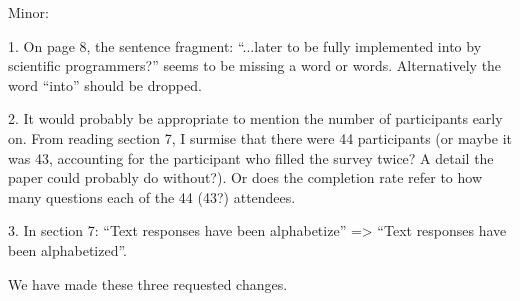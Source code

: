 \documentclass[11pt]{article}
\begin{document}
\begin{quoting}
Minor: 

1. On page 8, the sentence fragment: ``...later to be fully implemented into by scientific programmers?'' seems to be missing a word or words. Alternatively the word ``into'' should be dropped.

2. It would probably be appropriate to mention the number of participants early on. From reading section 7, I surmise that there were 44 participants (or maybe it was 43, accounting for the participant who filled the survey twice? A detail the paper could probably do without?). Or does the completion rate refer to how many questions each of the 44 (43?) attendees. 

3. In section 7: ``Text responses have been alphabetize'' => ``Text responses have been alphabetized''.
\end{quoting}

We have made these three requested changes.

\end{document}
